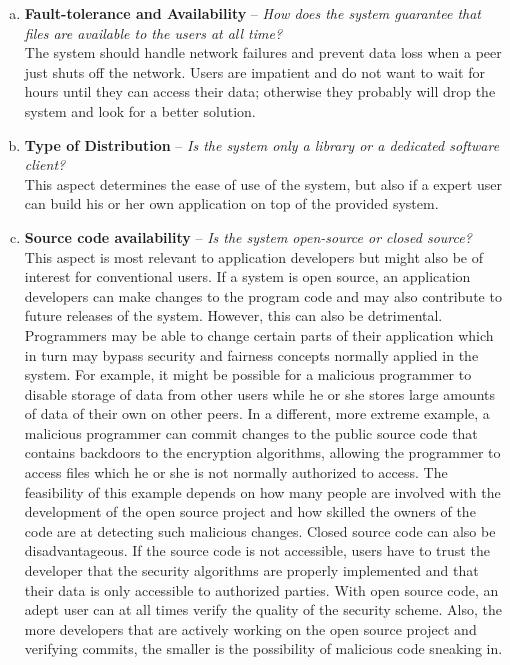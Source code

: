 \begin{enumerate}[(a)]
\item \textbf{Fault-tolerance and Availability} -- \textit{How does the system guarantee that files are available to the users at all time?}\\
The system should handle network failures and prevent data loss when a peer just shuts off the network. Users are impatient and do not want to wait for hours until they can access their data; otherwise they probably will drop the system and look for a better solution.

\item \textbf{Type of Distribution} -- \textit{Is the system only a library or a dedicated software client?}\\
This aspect determines the ease of use of the system, but also if a expert user can build his or her own application on top of the provided system.

\item \textbf{Source code availability} -- \textit{Is the system open-source or closed source?}\\
This aspect is most relevant to application developers but might also be of interest for conventional users. If a system is open source, an application developers can make changes to the program code and may also contribute to future releases of the system. However, this can also be detrimental. Programmers may be able to change certain parts of their application which in turn may bypass security and fairness concepts normally applied in the system. For example, it might be possible for a malicious programmer to disable storage of data from other users while he or she stores large amounts of data of their own on other peers. In a different, more extreme example, a malicious programmer can commit changes to the public source code that contains backdoors to the encryption algorithms, allowing the programmer to access files which he or she is not normally authorized to access. The feasibility of this example depends on how many people are involved with the development of the open source project and how skilled the owners of the code are at detecting such malicious changes.
Closed source code can also be disadvantageous. If the source code is not accessible, users have to trust the developer that the security algorithms are properly implemented and that their data is only accessible to authorized parties. With open source code, an adept user can at all times verify the quality of the security scheme. Also, the more developers that are actively working on the open source project and verifying commits, the smaller is the possibility of malicious code sneaking in.


\end{enumerate}
